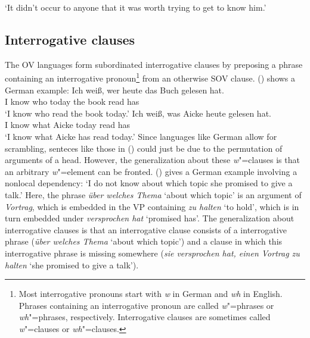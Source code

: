 \zl
\ea 
{}
\glt `It didn't occur to anyone that it was worth trying to get to know him.'
\z

\subsection{Interrogative clauses}
\label{sec-phen-interrogatives}

The OV languages form subordinated interrogative clauses by preposing a phrase containing an
interrogative pronoun\footnote{
Most interrogative pronouns start with \emph{w} in German and \emph{wh} in English. Phrases
containing an interrogative pronoun are called \emph{w}"=phrases or \emph{wh}"=phrases,
respectively. Interrogative clauses are sometimes called \emph{w}"=clauses or \emph{wh}"=clauses.
} from an
otherwise SOV clause. () shows a German example:
\eal
\ex 
\gll Ich weiß, wer heute das Buch gelesen hat.\\
     I know    who today the book read has\\
\glt `I know who read the book today.'
\ex 
\gll Ich weiß, was Aicke heute gelesen hat.\\
     I know    what Aicke today read has\\
\glt `I know what Aicke has read today.'
\zl
Since languages like German allow for scrambling, senteces like those in () could just be due
to the permutation of arguments of a head. However, the generalization about these \emph{w}"=clauses
is that an arbitrary \emph{w}"=element can be fronted. () gives a German example involving a nonlocal dependency:
\ea
\label{ex-wissen-Vortrag-halen-nonlocal}
\longexampleandlanguage{
\gll Ich weiß nicht, [über welches Thema]$_i$ sie versprochen hat, [[einen Vortrag \_$_i$] zu halten].\\
     I know not      \spacebr about which topic she promised has \hphantom{[[}a talk to  hold\\}{German}
\glt `I do not know about which topic she promised to give a talk.'
\z
Here, the phrase \emph{über welches Thema} `about which topic' is an argument of \emph{Vortrag},
which is embedded in the VP containing \emph{zu halten} `to hold', which is in turn embedded under
\emph{versprochen hat} `promised has'. The generalization about interrogative clauses is that an
interrogative clause consists of a interrogative phrase (\emph{über welches Thema} `about which
topic') and a clause in which this interrogative phrase is missing somewhere (\emph{sie versprochen
  hat, einen Vortrag zu halten} `she promised to give a talk').

